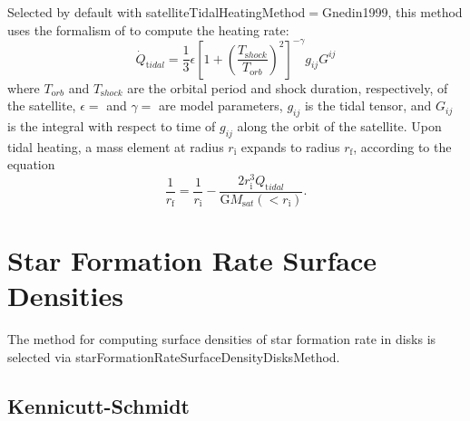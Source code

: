 Selected by default with {\normalfont \ttfamily satelliteTidalHeatingMethod}$=${\normalfont \ttfamily Gnedin1999}, this method uses the formalism of \cite{gnedin_tidal_1999} to compute the heating rate:
\begin{equation}
\dot{Q}_{\mathrm tidal}=\frac{1}{3}\epsilon\left[1+\left(\frac{T_{\mathrm shock}}{T_{\mathrm orb}}\right)^2\right]^{-\gamma}  g_{ij} G^{ij}
\end{equation}
where $T_{\mathrm orb}$ and $T_{\mathrm shock}$ are the orbital period and shock duration, respectively, of the satellite, $\epsilon=${\normalfont \ttfamily [satelliteTidalHeatingGnedinEpsilon]} and $\gamma=${\normalfont \ttfamily [satelliteTidalHeatingGnedinGamma]} are model parameters, $g_{ij}$ is the tidal tensor, and $G_{ij}$ is the integral with respect to time of $g_{ij}$ along the orbit of the satellite.  Upon tidal heating, a mass element at radius $r_{\mathrm i}$ expands to radius $r_{\mathrm f}$, according to the equation
\begin{equation}
\frac{1}{r_{\mathrm f}}=\frac{1}{r_{\mathrm i}}-\frac{2r_{\mathrm i}^3Q_{\mathrm tidal}}{{\mathrm G}M_{\mathrm sat}(<r_{\mathrm i})}.
\end{equation}

\section{Star Formation Rate Surface Densities}\label{sec:StarFormationRateSurfaceDensity}

The method for computing surface densities of star formation rate in disks is selected via {\normalfont \ttfamily starFormationRateSurfaceDensityDisksMethod}.

\subsection{Kennicutt-Schmidt}\label{sec:StarFormationKennicuttSchmidt}

